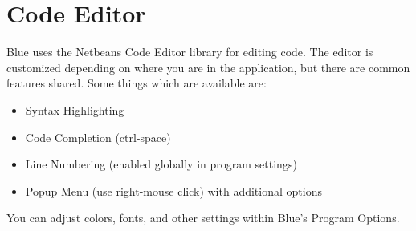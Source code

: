 \section{Code Editor}\label{codeEditor}

Blue uses the Netbeans Code Editor library for editing code. The editor
is customized depending on where you are in the application, but there
are common features shared. Some things which are available are:

\begin{itemize}
\item
  Syntax Highlighting
\item
  Code Completion (ctrl-space)
\item
  Line Numbering (enabled globally in program settings)
\item
  Popup Menu (use right-mouse click) with additional options
\end{itemize}

You can adjust colors, fonts, and other settings within Blue's Program
Options.
